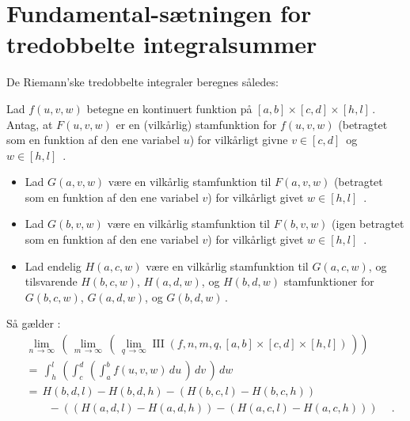

\section{Fundamental-sætningen for tredobbelte integralsummer}\label{secFundamIII}

De Riemann'ske tredobbelte integraler beregnes  således:

\begin{theorem}\label{thmAnalyseFundamental3}
Lad $f(u,v,w)$ betegne en kontinuert funktion på $[a, b]\times [c,d] \times [h, l]\,$. \\
Antag, at $F(u,v,w)$ er en (vilkårlig) stamfunktion for $f(u, v, w)$ (betragtet som en funktion af den ene variabel $u$) for vilkårligt givne $v \in [c, d]\,$ og $w \in [h, l]\,$ .
\begin{itemize}
\item Lad $G(a,v,w)$ være en vilkårlig stamfunktion til $F(a, v, w)$ (betragtet som en funktion af den  ene variabel $v$) for vilkårligt givet $w \in [h, l]\,$ .\\
\item Lad $G(b,v,w)$ være en vilkårlig stamfunktion til $F(b, v, w)$ (igen betragtet som en funktion af den  ene variabel $v$) for vilkårligt givet $w \in [h, l]\,$ . \\
\item Lad endelig $H(a, c, w)$ være en vilkårlig stamfunktion til $G(a, c, w)$, og tilsvarende $H(b, c, w)$, $H(a, d, w)$, og $H(b, d, w)$ stamfunktioner for $G(b, c, w)$, $G(a, d, w)$, og $G(b, d, w)\,$.
\end{itemize}
Så gælder :
\begin{equation} \label{eqDobbeltInt3Expand}
\begin{aligned}
&\lim_{n\, \to \infty}\, \left( \,\lim_{m\, \to \infty} \, \left(\,\lim_{q\, \to \infty} \operatorname{III}(f,n,m,q,
[a, b]\times [c,d]\times [h, l])\,\right) \right) \\ &= \,
\int_{h}^{l}\, \left(\int_{c}^{d}\, \left(
\int_{a}^{b} f(u,v,w)\, du \, \right)\, dv \, \right)\, dw \\ &= \,
H(b,d,l)-H(b,d,h) - \left(H(b,c,l) - H(b,c,h)\right) \\
 & \qquad - \left(\left(H(a,d,l)-H(a,d,h)\right) - \left(H(a,c,l)- H(a,c,h)\right)\right)\ \quad .
\end{aligned}
\end{equation}
\end{theorem}
\vspace{0.2cm}


